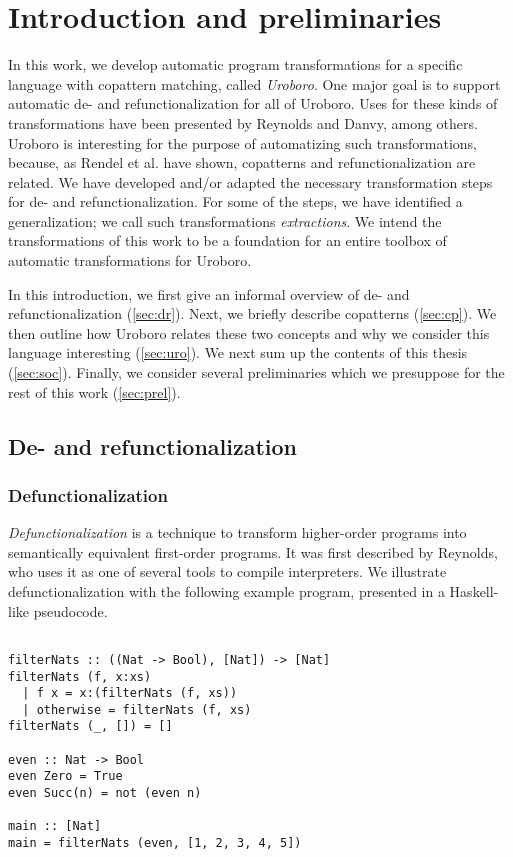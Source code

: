\chapter{Introduction and preliminaries}

In this work, we develop automatic program transformations for a specific language with copattern matching, called \textit{Uroboro}. One major goal is to support automatic de- and refunctionalization for all of Uroboro. Uses for these kinds of transformations have been presented by Reynolds and Danvy, among others. Uroboro is interesting for the purpose of automatizing such transformations, because, as Rendel et al. have shown, copatterns and refunctionalization are related. We have developed and/or adapted the necessary transformation steps for de- and refunctionalization. For some of the steps, we have identified a generalization; we call such transformations \textit{extractions}. We intend the transformations of this work to be a foundation for an entire toolbox of automatic transformations for Uroboro.

In this introduction, we first give an informal overview of de- and refunctionalization (\autoref{sec:dr}). Next, we briefly describe copatterns (\autoref{sec:cp}). We then outline how Uroboro relates these two concepts and why we consider this language interesting (\autoref{sec:uro}). We next sum up the contents of this thesis (\autoref{sec:soc}). Finally, we consider several preliminaries which we presuppose for the rest of this work (\autoref{sec:prel}).

\section{De- and refunctionalization}
\label{sec:dr}

\subsection{Defunctionalization}

\textit{Defunctionalization} is a technique to transform higher-order programs into semantically equivalent first-order programs. It was first described by Reynolds, who uses it as one of several tools to compile interpreters. We illustrate defunctionalization with the following example program, presented in a Haskell-like pseudocode.

\begin{lstlisting}

filterNats :: ((Nat -> Bool), [Nat]) -> [Nat]
filterNats (f, x:xs)
  | f x = x:(filterNats (f, xs))
  | otherwise = filterNats (f, xs)
filterNats (_, []) = []

even :: Nat -> Bool
even Zero = True
even Succ(n) = not (even n)

main :: [Nat]
main = filterNats (even, [1, 2, 3, 4, 5])

\end{lstlisting}

